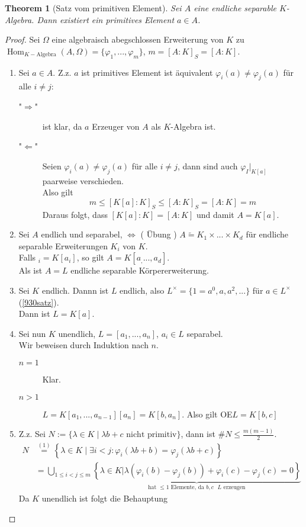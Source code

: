 \documentclass[10pt,a4paper]{article}
\newcommand{\la}{\ensuremath{\lambda}}
\newcommand{\isomorph}{\ensuremath{\tilde{=}}}
\newcommand{\Hom}{\operatorname{Hom}}
\newcounter{thm}[section]
\theoremstyle{definition}
\theoremstyle{plain}
\newtheorem{theorem}[thm]{Theorem}
\theoremstyle{remark}
\begin{document}
\begin{theorem}[Satz vom primitiven Element]\label{932thmPrimitiv}
	Sei $A$ eine endliche separable $K$-Algebra. Dann existiert ein primitives Element $a\in A$.
\end{theorem}
\begin{proof}
	Sei $\Omega$ eine algebraisch abegschlossen Erweiterung von $K$ zu $\Hom_{K-\text{Algebra}}(A,\Omega)=\{\varphi_1,...,\varphi_m\}$, $m=[A:K]_S=[A:K]$.
	\begin{enumerate}
		\item Sei $a\in A$. Z.z. $a$ ist primitives Element ist äquivalent $\varphi_i(a)\neq\varphi_j(a)$ für alle $i\neq j$:
		\begin{description}
			\item["$\Rightarrow$"] ist klar, da $a$ Erzeuger von $A$ als $K$-Algebra ist.
			\item["$\Leftarrow$"] Seien $\varphi_i(a)\neq\varphi_j(a)$ für alle $i\neq j$, dann sind auch $\varphi_I|_{K[a]}$ paarweise verschieden.\\
			Also gilt
			\[m\le [K[a]:K]_S\leq[A:K]_S=[A:K]=m\]
			Daraus folgt, dass $[K[a]:K]=[A:K]$ und damit $A=K[a]$.
		\end{description}
		\item Sei $A$ endlich und separabel, $\Leftrightarrow$ ( Übung %
		) $A\isomorph K_1\times...\times K_d$ für endliche separable Erweiterungen $K_i$ von $K$.\\
		Falls $_i=K[a_i]$, so gilt $A=K[a_,...,a_d]$.\\
		Als ist $A=L$ endliche separable Körpererweiterung.
		\item Sei $K$ endlich. Dannn ist $L$ endlich, also $L^\times=\{1=a^0,a,a^2,...\}$ für $a\in L^\times$ (\ref{930satz}).\\
		Dann ist $L=K[a]$.
		\item Sei nun $K$ unendlich, $L=[a_1,...,a_n]$, $a_i\in L$ separabel.\\
		Wir beweisen durch Induktion nach $n$.
		\begin{description}
			\item[$n=1$] Klar.
			\item[$n>1$] $L=K[a_1,...,a_{n-1}][a_n]=K[b,a_n]$. Also gilt OE$L=K[b,c]$
		\end{description}
		\item Z.z. Sei $N:=\{\la\in K\mid \la b+c\text{ nicht primitiv}\}$, dann ist $\#N\leq \frac{m(m-1)}{2}$.
		\begin{align*}
		N&\overset{(1)}{=}\left\{\la\in K\mid \exists i<j:\varphi_i(\la b+b)=\varphi_j(\la b+c)\right\}\\
		&=\bigcup_{1\leq i<j\leq m}\underbrace{\left\{\la\in K|\la(\varphi
		_i(b)-\varphi_j(b))+\varphi_i(c)-\varphi_j(c)=0\right\}}_{\text{hat $\leq 1$ Elemente, da $b,c$ $L$ erzeugen}}
		\end{align*}
		Da $K$ unendlich ist folgt die Behauptung\\
	\end{enumerate}
\end{proof}
\end{document}
